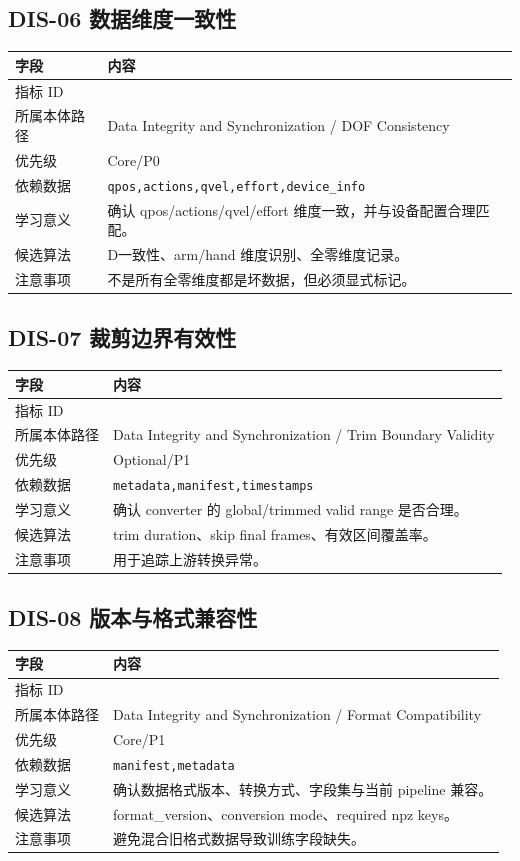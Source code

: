 \documentclass[UTF8,zihao=-4]{ctexart}
\newcommand{\Code}[1]{\texttt{#1}}
\newcommand{\MID}[1]{\texttt{\seqsplit{#1}}}
\begin{document}
\subsection{DIS-06 数据维度一致性}

\begin{longtable}{L{3.6cm} L{9.6cm}}
\toprule
字段 & 内容 \\
\midrule
指标 ID & \MID{DIS-06} \\
所属本体路径 & Data Integrity and Synchronization / DOF Consistency \\
优先级 & Core/P0 \\
依赖数据 & \Code{qpos,actions,qvel,effort,device\_info} \\
学习意义 & 确认 qpos/actions/qvel/effort 维度一致，并与设备配置合理匹配。 \\
候选算法 & D一致性、arm/hand 维度识别、全零维度记录。 \\
注意事项 & 不是所有全零维度都是坏数据，但必须显式标记。 \\
\bottomrule
\end{longtable}

\subsection{DIS-07 裁剪边界有效性}

\begin{longtable}{L{3.6cm} L{9.6cm}}
\toprule
字段 & 内容 \\
\midrule
指标 ID & \MID{DIS-07} \\
所属本体路径 & Data Integrity and Synchronization / Trim Boundary Validity \\
优先级 & Optional/P1 \\
依赖数据 & \Code{metadata,manifest,timestamps} \\
学习意义 & 确认 converter 的 global/trimmed valid range 是否合理。 \\
候选算法 & trim duration、skip final frames、有效区间覆盖率。 \\
注意事项 & 用于追踪上游转换异常。 \\
\bottomrule
\end{longtable}

\subsection{DIS-08 版本与格式兼容性}

\begin{longtable}{L{3.6cm} L{9.6cm}}
\toprule
字段 & 内容 \\
\midrule
指标 ID & \MID{DIS-08} \\
所属本体路径 & Data Integrity and Synchronization / Format Compatibility \\
优先级 & Core/P1 \\
依赖数据 & \Code{manifest,metadata} \\
学习意义 & 确认数据格式版本、转换方式、字段集与当前 pipeline 兼容。 \\
候选算法 & format\_version、conversion mode、required npz keys。 \\
注意事项 & 避免混合旧格式数据导致训练字段缺失。 \\
\bottomrule
\end{longtable}
\end{document}
